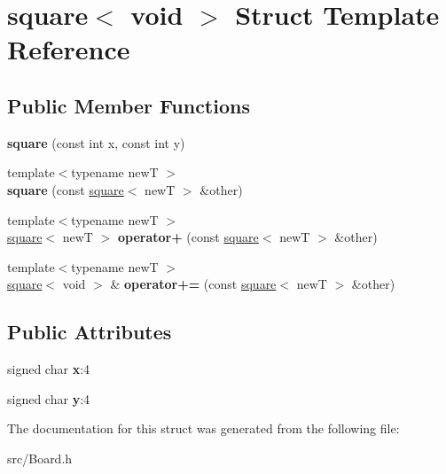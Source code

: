 \hypertarget{structsquare_3_01void_01_4}{}\section{square$<$ void $>$ Struct Template Reference}
\label{structsquare_3_01void_01_4}
\subsection*{Public Member Functions}
\begin{DoxyCompactItemize}
\item 
\mbox{\label{structsquare_3_01void_01_4_acad0604c4c01934956f9e547b61963bd}} 
{\bfseries square} (const int x, const int y)
\item 
\mbox{\label{structsquare_3_01void_01_4_a3144b85567ed10bfc6ecc5cafbe4e4ac}} 
{\footnotesize template$<$typename newT $>$ }\\{\bfseries square} (const \hyperlink{structsquare}{square}$<$ newT $>$ \&other)
\item 
\mbox{\label{structsquare_3_01void_01_4_ab7ae9a220b3d4aa3afce1873c25558eb}} 
{\footnotesize template$<$typename newT $>$ }\\\hyperlink{structsquare}{square}$<$ newT $>$ {\bfseries operator+} (const \hyperlink{structsquare}{square}$<$ newT $>$ \&other)
\item 
\mbox{\label{structsquare_3_01void_01_4_ad485847afc64f74cbae220e801dd3c38}} 
{\footnotesize template$<$typename newT $>$ }\\\hyperlink{structsquare}{square}$<$ void $>$ \& {\bfseries operator+=} (const \hyperlink{structsquare}{square}$<$ newT $>$ \&other)
\end{DoxyCompactItemize}
\subsection*{Public Attributes}
\begin{DoxyCompactItemize}
\item 
\mbox{\label{structsquare_3_01void_01_4_a1b2185b1eacd68916a02287c21916a25}} 
signed char {\bfseries x}\+:4
\item 
\mbox{\label{structsquare_3_01void_01_4_a2f5565ddd32970d151f1973db2fc3881}} 
signed char {\bfseries y}\+:4
\end{DoxyCompactItemize}


The documentation for this struct was generated from the following file\+:\begin{DoxyCompactItemize}
\item 
src/Board.\+h\end{DoxyCompactItemize}
